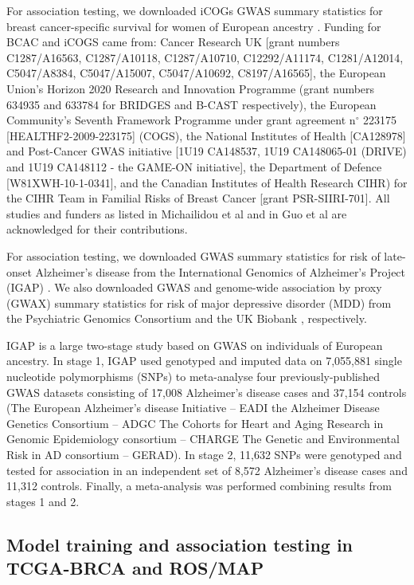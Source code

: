 For association testing, we downloaded
iCOGs GWAS summary statistics for
breast cancer-specific survival for
women of European ancestry \cite{Guo2015}.
Funding for BCAC and iCOGS came from: 
Cancer Research UK [grant numbers 
C1287/A16563, C1287/A10118, C1287/A10710, 
C12292/A11174, C1281/A12014, C5047/A8384, 
C5047/A15007, C5047/A10692, C8197/A16565], 
the European Union’s Horizon 2020 Research 
and Innovation Programme (grant numbers 
634935 and 633784 for BRIDGES and B-CAST respectively), the European Community’s 
Seventh Framework Programme under grant 
agreement n$^\circ$ 223175 
[HEALTHF2-2009-223175] (COGS), 
the National Institutes of Health 
[CA128978] and Post-Cancer GWAS 
initiative [1U19 CA148537, 1U19 
CA148065-01 (DRIVE) and 1U19 
CA148112 - the GAME-ON initiative], 
the Department of Defence [W81XWH-10-1-0341], 
and the Canadian Institutes of Health Research CIHR)
for the CIHR Team in Familial Risks of Breast 
Cancer [grant PSR-SIIRI-701]. All studies and 
funders as listed in Michailidou
et al \cite{Michailidou2013,Michailidou2015} 
and in Guo et al \cite{Guo2015} 
are acknowledged for their contributions.


For association testing, we downloaded
GWAS summary statistics for risk of
late-onset Alzheimer's disease 
from the International Genomics
of Alzheimer's Project (IGAP)
\cite{Lambert2013Meta-analysisDisease}.
We also downloaded GWAS and genome-wide
association by proxy (GWAX) summary statistics
for risk of major depressive
disorder (MDD) from the Psychiatric Genomics
Consortium \cite{Wray2018Genome-wideDepression}
and the UK Biobank \cite{Liu2017Case-controlDisease}, respectively.

IGAP is a large two-stage study based on GWAS 
on individuals of European ancestry. 
In stage 1, IGAP used genotyped and 
imputed data on 7,055,881 single 
nucleotide polymorphisms (SNPs) to 
meta-analyse four previously-published
GWAS datasets consisting of 17,008
Alzheimer's disease cases and 
37,154 controls (The European 
Alzheimer's disease Initiative –
EADI the Alzheimer Disease Genetics 
Consortium – ADGC The Cohorts for
Heart and Aging Research in Genomic 
Epidemiology consortium – CHARGE The 
Genetic and Environmental Risk in AD 
consortium – GERAD). In stage 2, 11,632
SNPs were genotyped and tested for 
association in an independent set of 
8,572 Alzheimer's disease cases and 
11,312 controls. Finally, a 
meta-analysis was performed combining results from stages 1 and 2.

\subsection{Model training
and association testing in
TCGA-BRCA and ROS/MAP}

